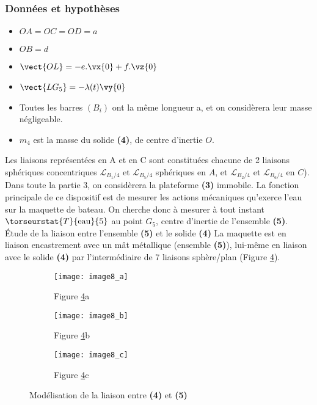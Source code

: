 \subsubsection*{Données et hypothèses}
 \begin{itemize}
 \item $OA=OC=OD=a$
 \item $OB=d$
 \item $\vect{OL}=-e.\vx{0}+f.\vz{0}$
 \item $\vect{LG_5}=-\lambda (t) \vy{0}$
 \item Toutes les barres $(B_i)$ ont la même longueur a, et on considèrera leur masse négligeable.
 \item $m_4$ est la masse du solide \textbf{(4)}, de centre d’inertie $O$.
\end{itemize} 

Les liaisons représentées en A et en C sont constituées chacune de 2 liaisons sphériques concentriques $\mathcal{L}_{B_1/4}$ et $\mathcal{L}_{B_5/4}$ sphériques en $A$, et $\mathcal{L}_{B_2/4}$ et $\mathcal{L}_{B_6/4}$ en $C$).
Dans toute la partie 3, on considèrera la plateforme \textbf{(3)} immobile.
La fonction principale de ce dispositif est de mesurer les actions mécaniques qu’exerce l’eau sur la maquette de bateau. On cherche donc à mesurer à tout instant $\torseurstat{T}{\text{eau}}{5}$ au point $G_5$, centre d’inertie de l’ensemble \textbf{(5)}.
Étude de la liaison entre l’ensemble \textbf{(5)} et le solide \textbf{(4)}
La maquette est en liaison encastrement avec un mât métallique (ensemble \textbf{(5)}), lui-même en liaison avec le solide \textbf{(4)} par l’intermédiaire de 7 liaisons sphère/plan (Figure \ref{fig:CCMP:2021:08}).


\begin{figure}[!h]
\centering
    \begin{subfigure}[b]{.3\textwidth}
    \centering
    \texttt{[image: image8\_a]}
    \caption{Figure \ref{fig:CCMP:2021:08}a \label{fig:CCMP:2021:08:a}}
    \end{subfigure}
    \hfill
    \begin{subfigure}[b]{.3\textwidth}
    \centering
    \texttt{[image: image8\_b]}
    \caption{Figure \ref{fig:CCMP:2021:08}b \label{fig:CCMP:2021:08:b}}
    \end{subfigure}
    \hfill
    \begin{subfigure}[b]{.3\textwidth}
    \centering
    \texttt{[image: image8\_c]}
    \caption{Figure \ref{fig:CCMP:2021:08}c \label{fig:CCMP:2021:08:c}}
    \end{subfigure}
\caption{ \label{fig:CCMP:2021:08} Modélisation de la liaison entre \textbf{(4)} et \textbf{(5)}}
\end{figure}


